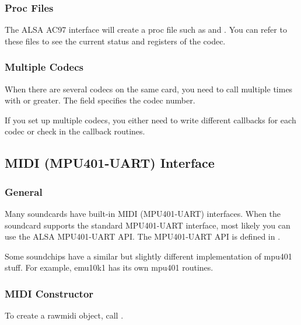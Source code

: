 \documentclass[a4paper,8pt,english]{sphinxmanual}
\begin{document}
\subsubsection{Proc Files}
\label{sound/kernel-api/writing-an-alsa-driver:proc-files}
The ALSA AC97 interface will create a proc file such as
 and . You
can refer to these files to see the current status and registers of
the codec.


\subsubsection{Multiple Codecs}
\label{sound/kernel-api/writing-an-alsa-driver:multiple-codecs}
When there are several codecs on the same card, you need to call
{\hyperref[sound/kernel\string-api/alsa\string-driver\string-api:c.snd_ac97_mixer]{\emph{}}} multiple times with  or
greater. The  field specifies the codec number.

If you set up multiple codecs, you either need to write different
callbacks for each codec or check  in the callback
routines.


\subsection{MIDI (MPU401-UART) Interface}
\label{sound/kernel-api/writing-an-alsa-driver:midi-mpu401-uart-interface}

\subsubsection{General}
\label{sound/kernel-api/writing-an-alsa-driver:id7}
Many soundcards have built-in MIDI (MPU401-UART) interfaces. When the
soundcard supports the standard MPU401-UART interface, most likely you
can use the ALSA MPU401-UART API. The MPU401-UART API is defined in
.

Some soundchips have a similar but slightly different implementation of
mpu401 stuff. For example, emu10k1 has its own mpu401 routines.


\subsubsection{MIDI Constructor}
\label{sound/kernel-api/writing-an-alsa-driver:midi-constructor}
To create a rawmidi object, call {\hyperref[sound/kernel\string-api/alsa\string-driver\string-api:c.snd_mpu401_uart_new]{\emph{}}}.
\end{document}
